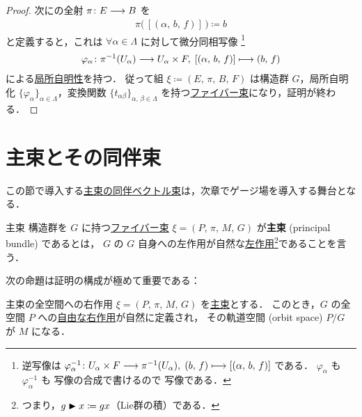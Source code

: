 \documentclass[geometry_main]{subfiles}
\begin{document}
\begin{proof}
	次に\cinfty の全射 $\pi \colon E \longrightarrow B$ を
	\begin{align}
		\pi \bigl(\, [(\alpha,\, b,\, f)]\, \bigr) \coloneqq b
	\end{align}
	と定義すると，これは $\forall \alpha \in \Lambda$ に対して微分同相写像
    \footnote{
        逆写像は $\varphi_\alpha^{-1} \colon U_\alpha \times F \longrightarrow \pi^{-1}(U_\alpha),\; (b,\, f) \longmapsto [(\alpha,\, b,\, f)]$ である．
        $\varphi_\alpha$ も $\varphi_\alpha^{-1}$ も \cinfty 写像の合成で書けるので \cinfty 写像である．
    }
	\begin{align}
		\varphi_\alpha \colon \pi^{-1}(U_\alpha) \longrightarrow U_\alpha \times F,\; [(\alpha,\, b,\, f)] \longmapsto (b,\, f)
	\end{align}
	による\hyperref[fig.bundle_homo]{局所自明性}を持つ．
	従って組 $\xi \coloneqq (E,\, \pi,\, B,\, F)$ は構造群 $G$，局所自明化 $\{\varphi_\alpha\}_{\alpha \in \Lambda}$，変換関数 $\{t_{\alpha\beta}\}_{\alpha,\, \beta \in \Lambda}$ を持つ\hyperref[def.fiber-1]{ファイバー束}になり，証明が終わる．
\end{proof}

\section{主束とその同伴束}

この節で導入する\hyperref[def:associated-vect]{主束の同伴ベクトル束}は，次章でゲージ場を導入する舞台となる．

\begin{mydef}[label=def.PFD]{主束}
    構造群を $G$ に持つ\hyperref[def.fiber-1]{ファイバー束} $\xi = (P,\, \pi,\, M,\, G)$ が\textbf{主束} (principal bundle) であるとは，
    $G$ の $G$ 自身への左作用が自然な\hyperref[def:Lie-action]{左作用}\footnote{つまり，$g \blacktriangleright x \coloneqq gx$（Lie群の積）である．}であることを言う．
\end{mydef}

次の命題は証明の構成が極めて重要である：
\begin{myprop}[label=prop.PFD_right]{主束の全空間への右作用}
	$\xi = (P,\, \pi,\, M,\, G)$ を\hyperref[def.PFD]{主束}とする．
    このとき，$G$ の全空間 $P$ への\hyperref[def:Lie-action]{自由な右作用}が自然に定義され，
	その軌道空間 (orbit space) $P/G$ が $M$ になる．
\end{myprop}
\end{document}

